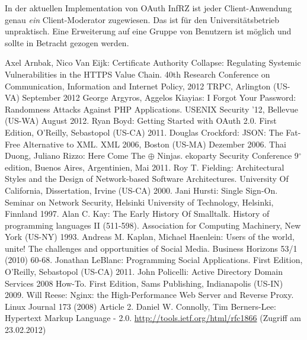 \documentclass[12pt,a4paper,pointednumbers,abstracton]{scrartcl}
\begin{document}
In der aktuellen Implementation von OAuth InfRZ ist jeder Client-Anwendung genau \emph{ein} Client-Moderator zugewiesen.
Das ist für den Universitätsbetrieb unpraktisch.
Eine Erweiterung auf eine Gruppe von Benutzern ist möglich und sollte in Betracht gezogen werden.

\newpage
{}
\begin{raggedright}%
\begin{thebibliography}{XXXXXXXX}
     Axel Arnbak, Nico Van Eijk: Certificate Authority Collapse: Regulating Systemic Vulnerabilities in the HTTPS Value Chain. 40th Research Conference on Communication, Information and Internet Policy, 2012 TRPC, Arlington (US-VA) September 2012
     George Argyros, Aggelos Kiayias: I Forgot Your Password: Randomness Attacks Against PHP Applications. USENIX Security '12, Bellevue (US-WA) August 2012.
	 Ryan Boyd: Getting Started with OAuth 2.0. First Edition, O'Reilly, Sebastopol (US-CA) 2011.
	 Douglas Crockford: JSON: The Fat-Free Alternative to XML. XML 2006, Boston (US-MA) Dezember 2006.
	 Thai Duong, Juliano Rizzo: Here Come The $\oplus$ Ninjas. ekoparty Security Conference 9$^\circ$ edition, Buenos Aires, Argentinien, Mai 2011.
	 Roy T. Fielding: Architectural Styles and the Design of Network-based Software Architectures. University Of California, Dissertation, Irvine (US-CA) 2000.
	 Jani Hursti: Single Sign-On. Seminar on Network Security, Helsinki University of Technology, Helsinki, Finnland 1997.
	 Alan C. Kay: The Early History Of Smalltalk. History of programming languages II (511-598). Association for Computing Machinery, New York (US-NY) 1993.
	 Andreas M. Kaplan, Michael Haenlein: Users of the world, unite! The challenges and opportunities of Social Media. Business Horizons 53/1 (2010) 60-68.
	 Jonathan LeBlanc: Programming Social Applications. First Edition, O'Reilly, Sebastopol (US-CA) 2011.
	 John Policelli: Active Directory Domain Services 2008 How-To. First Edition, Sams Publishing, Indianapolis (US-IN) 2009.
	 Will Reese:  Nginx: the High-Performance Web Server and Reverse Proxy. Linux Journal 173 (2008) Article 2.
	 Daniel W. Connolly, Tim Berners-Lee: Hypertext Markup Language - 2.0. \url{http://tools.ietf.org/html/rfc1866} (Zugriff am 23.02.2012)

\end{thebibliography}
\end{raggedright}
\end{document}
